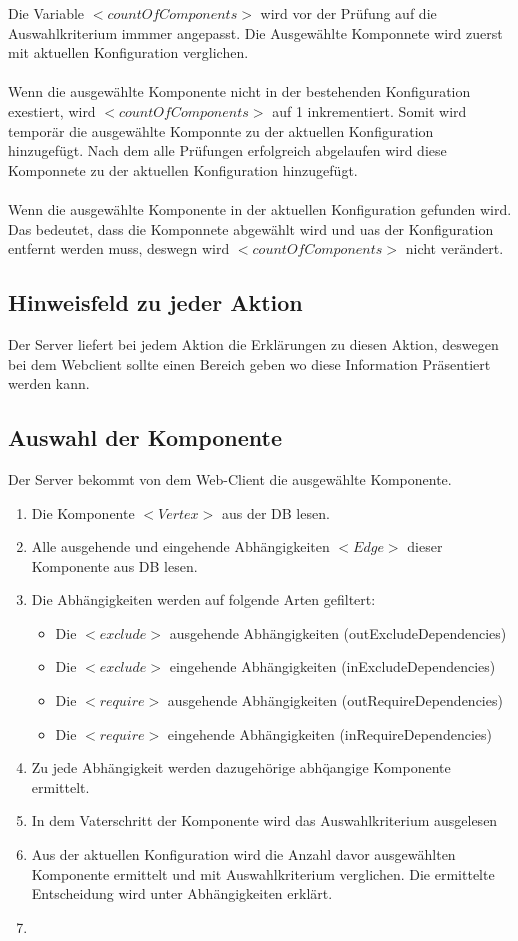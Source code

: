 \documentclass{article}
\begin{document}
\noindent Die Variable $<countOfComponents>$ wird vor der Prüfung auf die
Auswahlkriterium immmer angepasst. Die Ausgew\"ahlte Komponnete wird zuerst mit aktuellen
Konfiguration verglichen. \\\\
Wenn die ausgew\"ahlte Komponente nicht in der
bestehenden Konfiguration exestiert, wird $<countOfComponents>$ auf 1
inkrementiert. Somit wird tempor\"ar die ausgewählte Komponnte zu der aktuellen
Konfiguration hinzugefügt. Nach dem alle Pr\"ufungen erfolgreich abgelaufen wird
diese Komponnete zu der aktuellen Konfiguration hinzugefügt.\\\\
Wenn die ausgew\"ahlte Komponente in der aktuellen Konfiguration gefunden wird.
Das bedeutet, dass die Komponnete abgew\"ahlt wird und uas der Konfiguration
entfernt werden muss, deswegn wird $<countOfComponents>$ nicht ver\"andert.

\subsection{Hinweisfeld zu jeder Aktion}
Der Server liefert bei jedem Aktion die Erklärungen zu diesen Aktion, deswegen
bei dem Webclient sollte einen Bereich geben wo diese Information Präsentiert
werden kann.

\subsection{Auswahl der Komponente}

Der Server bekommt von dem Web-Client die ausgew\"ahlte Komponente.

\begin{enumerate}
    \item Die Komponente $<Vertex>$ aus der DB lesen.
    \item Alle ausgehende und eingehende Abh\"angigkeiten $<Edge>$ dieser
    Komponente aus DB lesen.
    \item Die Abh\"angigkeiten werden auf folgende Arten gefiltert:
    \begin{itemize}
        \item Die $<exclude>$ ausgehende Abh\"angigkeiten
        (outExcludeDependencies)
        \item Die $<exclude>$ eingehende Abh\"angigkeiten
        (inExcludeDependencies)
        \item Die $<require>$ ausgehende Abh\"angigkeiten
        (outRequireDependencies)
        \item Die $<require>$ eingehende Abh\"angigkeiten
        (inRequireDependencies)
    \end{itemize}
    \item Zu jede Abh\"angigkeit werden dazugeh\"orige abh\"qangige Komponente
    ermittelt.
    \item In dem Vaterschritt der Komponente wird das Auswahlkriterium
    ausgelesen
    \item Aus der aktuellen Konfiguration wird die Anzahl davor ausgew\"ahlten
    Komponente ermittelt und mit Auswahlkriterium verglichen. Die ermittelte
    Entscheidung wird unter Abh\"angigkeiten erkl\"art.
    \item 
\end{enumerate}
\end{document}
